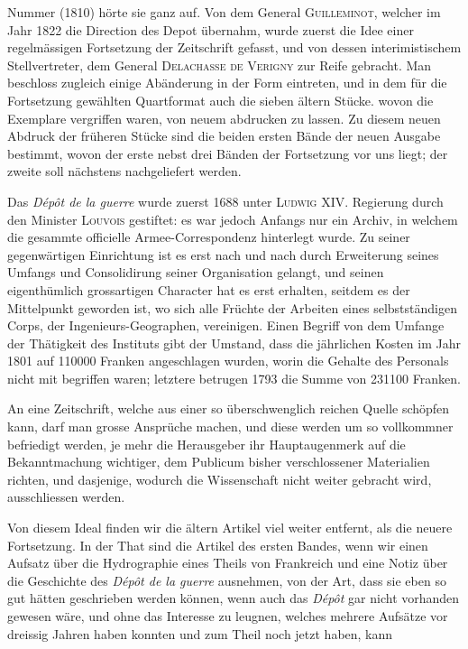 %
Nummer (1810) hörte sie ganz auf. Von dem General \textsc{Guilleminot}, welcher im Jahr 1822 die Direction des Depot übernahm, wurde zuerst die Idee einer regelmässigen Fortsetzung der Zeitschrift gefasst, und von dessen interimistischem Stellvertreter, dem General \textsc{Delachasse de Verigny} zur Reife gebracht. Man beschloss zugleich einige Abänderung in der Form eintreten, und in dem für die Fortsetzung gewählten Quartformat auch die sieben ältern Stücke. wovon die Exemplare vergriffen waren, von neuem abdrucken zu lassen. Zu diesem neuen Abdruck der früheren Stücke sind die beiden ersten Bände der neuen Ausgabe bestimmt, wovon der erste nebst drei Bänden der Fortsetzung vor uns liegt; der zweite soll nächstens nachgeliefert werden.

Das \textit{Dépôt de la guerre} wurde zuerst 1688 unter \textsc{Ludwig} XIV. Regierung durch den Minister \textsc{Louvois} gestiftet: es war jedoch Anfangs nur ein Archiv, in welchem die gesammte officielle Armee-Correspondenz hinterlegt wurde. Zu seiner gegenwärtigen Einrichtung ist es erst nach und nach durch Erweiterung seines Umfangs und Consolidirung seiner Organisation gelangt, und seinen eigenthümlich grossartigen Character hat es erst erhalten, seitdem es der Mittelpunkt geworden ist, wo sich alle Früchte der Arbeiten eines selbstständigen Corps, der Ingenieurs-Geographen, vereinigen. Einen Begriff von dem Umfange der Thätigkeit des Instituts gibt der Umstand, dass die jährlichen Kosten im Jahr 1801 auf 110000 Franken angeschlagen wurden, worin die Gehalte des Personals nicht mit begriffen waren; letztere betrugen 1793 die Summe von 231100 Franken.

An eine Zeitschrift, welche aus einer so überschwenglich reichen Quelle schöpfen kann, darf man grosse Ansprüche machen, und diese werden um so vollkommner befriedigt werden, je mehr die Herausgeber ihr Hauptaugenmerk auf die Bekanntmachung wichtiger, dem Publicum bisher verschlossener Materialien richten, und dasjenige, wodurch die Wissenschaft nicht weiter gebracht wird, ausschliessen werden.

Von diesem Ideal finden wir die ältern Artikel viel weiter entfernt, als die neuere Fortsetzung. In der That sind die Artikel des ersten Bandes, wenn wir einen Aufsatz über die Hydrographie eines Theils von Frankreich und eine Notiz über die Geschichte des \textit{Dépôt de la guerre} ausnehmen, von der Art, dass sie eben so gut hätten geschrieben werden können, wenn auch das \textit{Dépôt} gar nicht vorhanden gewesen wäre, und ohne das Interesse zu leugnen, welches mehrere Aufsätze vor dreissig Jahren haben konnten und zum Theil noch jetzt haben, kann
